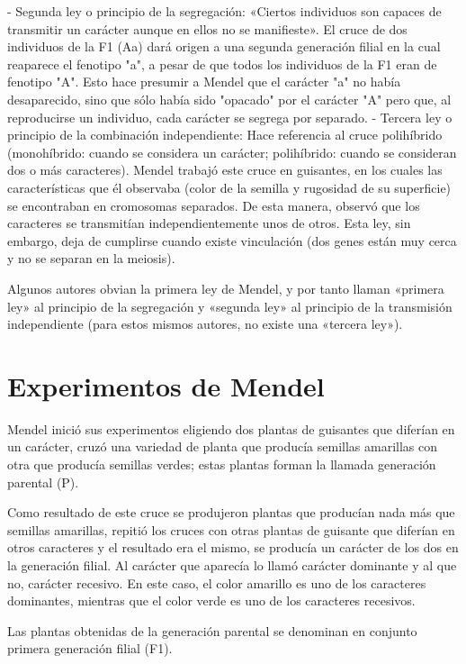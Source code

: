 \documentclass[letterpaper,12pt]{report}
\begin{document}
- Segunda ley o principio de la segregación: «Ciertos individuos son capaces de transmitir un carácter aunque en ellos no se manifieste». El cruce de dos individuos de la F1 (Aa) dará origen a una segunda generación filial en la cual reaparece el fenotipo "a", a pesar de que todos los individuos de la F1 eran de fenotipo "A". Esto hace presumir a Mendel que el carácter "a" no había desaparecido, sino que sólo había sido "opacado" por el carácter "A" pero que, al reproducirse un individuo, cada carácter se segrega por separado.
- Tercera ley o principio de la combinación independiente: Hace referencia al cruce polihíbrido (monohíbrido: cuando se considera un carácter; polihíbrido: cuando se consideran dos o más caracteres). Mendel trabajó este cruce en guisantes, en los cuales las características que él observaba (color de la semilla y rugosidad de su superficie) se encontraban en cromosomas separados. De esta manera, observó que los caracteres se transmitían independientemente unos de otros. Esta ley, sin embargo, deja de cumplirse cuando existe vinculación (dos genes están muy cerca y no se separan en la meiosis).

Algunos autores obvian la primera ley de Mendel, y por tanto llaman «primera ley» al principio de la segregación y «segunda ley» al principio de la transmisión independiente (para estos mismos autores, no existe una «tercera ley»).


\chapter{Experimentos de Mendel}

\thispagestyle{empty}

Mendel inició sus experimentos eligiendo dos plantas de guisantes que diferían en un carácter, cruzó una variedad de planta que producía semillas amarillas con otra que producía semillas verdes; estas plantas forman la llamada generación parental (P).

Como resultado de este cruce se produjeron plantas que producían nada más que semillas amarillas, repitió los cruces con otras plantas de guisante que diferían en otros caracteres y el resultado era el mismo, se producía un carácter de los dos en la generación filial. Al carácter que aparecía lo llamó carácter dominante y al que no, carácter recesivo. En este caso, el color amarillo es uno de los caracteres dominantes, mientras que el color verde es uno de los caracteres recesivos.

Las plantas obtenidas de la generación parental se denominan en conjunto primera generación filial (F1).
\end{document}
